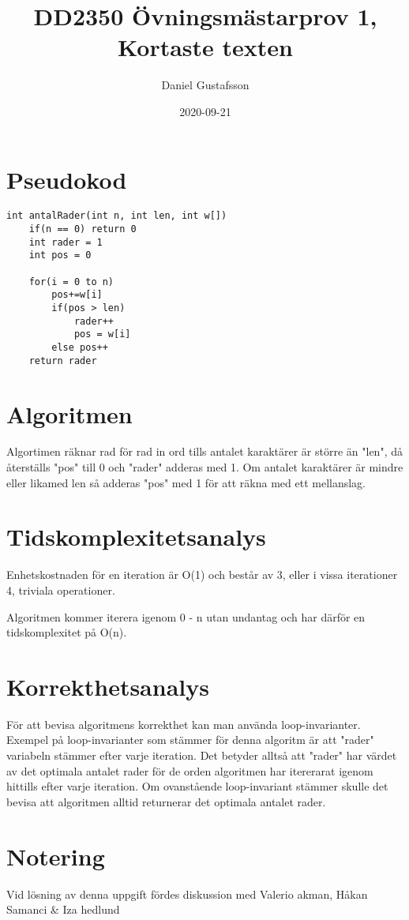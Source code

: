 \documentclass[11pt]{article}
\title{DD2350 Övningsmästarprov 1, Kortaste texten}
\date{2020-09-21}
\author{Daniel Gustafsson}
\begin{document}
\maketitle
\newpage

\section{Pseudokod}
\begin{lstlisting}
int antalRader(int n, int len, int w[])
    if(n == 0) return 0
    int rader = 1
    int pos = 0

    for(i = 0 to n)
        pos+=w[i]
        if(pos > len)
            rader++
            pos = w[i]
        else pos++
    return rader
\end{lstlisting}
\section{Algoritmen}
Algortimen räknar rad för rad in ord tills antalet karaktärer
är större än "len", då återställs "pos" till 0 och "rader"
adderas med 1. Om antalet karaktärer är mindre eller likamed 
len så adderas "pos" med 1 för att räkna med ett mellanslag.
\section{Tidskomplexitetsanalys}
Enhetskostnaden för en iteration är O(1) och består av 3,
eller i vissa iterationer 4, triviala operationer.

Algoritmen kommer iterera igenom 0 - n utan undantag och 
har därför en tidskomplexitet på O(n).
\section{Korrekthetsanalys}
För att bevisa algoritmens korrekthet kan man använda
loop-invarianter. Exempel på loop-invarianter som stämmer
för denna algoritm är att "rader" variabeln stämmer
efter varje iteration. Det betyder alltså att "rader" har
värdet av det optimala antalet rader för de orden 
algoritmen har itererarat igenom hittills efter varje 
iteration.
Om ovanstående loop-invariant stämmer skulle det bevisa
att algoritmen alltid returnerar det optimala antalet rader.

\section{Notering}
Vid lösning av denna uppgift fördes diskussion med Valerio akman, 
Håkan Samanci \& Iza hedlund
\end{document}
